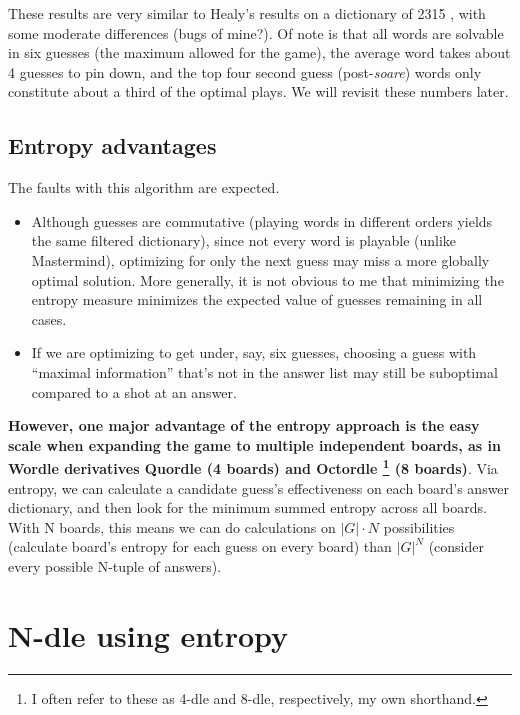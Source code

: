 \documentclass[11pt, oneside]{article} 	%
\begin{document}
These results are very similar to Healy's results on a dictionary of 2315 \cite{1}, with some moderate differences (bugs of mine?). Of note is that all words are solvable in six guesses (the maximum allowed for the game), the average word takes about 4 guesses to pin down, and the top four second guess (post-\emph{soare}) words only constitute about a third of the optimal plays. We will revisit these numbers later.

\subsection{Entropy advantages}

The faults with this algorithm are expected. 
\begin{itemize}
\item Although guesses are commutative (playing words in different orders yields the same filtered dictionary), since not every word is playable (unlike Mastermind), optimizing for only the next guess may miss a more globally optimal solution. More generally, it is not obvious to me that minimizing the entropy measure minimizes the expected value of guesses remaining in all cases. 
\item If we are optimizing to get under, say, six guesses, choosing a guess with ``maximal information'' that's not in the answer list may still be suboptimal compared to a shot at an answer.
\end{itemize}

\textbf{However, one major advantage of the entropy approach is the easy scale when expanding the game to multiple independent boards, as in Wordle derivatives Quordle (4 boards) and Octordle \footnote{I often refer to these as 4-dle and 8-dle, respectively, my own shorthand.} (8 boards)}. Via entropy, we can calculate a candidate guess's effectiveness on each board's answer dictionary, and then look for the minimum summed entropy across all boards. With N boards, this means we can do calculations on $|G|\cdot N$ possibilities (calculate board's entropy for each guess on every board) than $|G|^N$ (consider every possible N-tuple of answers).

\section{N-dle using entropy}
\end{document}
